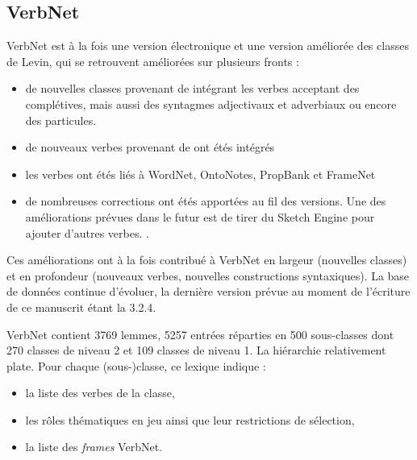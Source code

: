 \subsection{VerbNet}
\label{subsec:presentation_verbnet}

VerbNet \citep{kipperschuler2005verbnet} est à la fois une version électronique
et une version améliorée des classes de Levin, qui se retrouvent améliorées sur
plusieurs fronts :

\begin{itemize}

    \item de nouvelles classes provenant de \cite{korhonen2004extended}
        intégrant les verbes acceptant des complétives, mais aussi des
        syntagmes adjectivaux et adverbiaux ou encore des particules.

    \item de nouveaux verbes provenant de \cite{dorr2001lcs} ont étés intégrés

    \item les verbes ont étés liés à WordNet, OntoNotes, PropBank et FrameNet
        \citep{palmer2009semlink}

    \item de nombreuses corrections ont étés apportées au fil des versions. Une
        des améliorations prévues dans le futur est de tirer du Sketch Engine
        pour ajouter d'autres verbes. \citep{bonial2013expanding}.

\end{itemize}

Ces améliorations ont à la fois contribué à VerbNet en largeur (nouvelles
classes) et en profondeur (nouveaux verbes, nouvelles constructions
syntaxiques). La base de données continue d'évoluer, la dernière version prévue
au moment de l'écriture de ce manuscrit étant la 3.2.4.

VerbNet contient 3769 lemmes, 5257 entrées réparties en 500 sous-classes dont
270 classes de niveau 2 et 109 classes de niveau 1. La hiérarchie relativement
plate. Pour chaque (sous-)classe, ce lexique indique :

\begin{itemize}
        \item la liste des verbes de la classe,
        \item les rôles thématiques en jeu ainsi que leur restrictions de sélection,
        \item la liste des \emph{frames} VerbNet.
\end{itemize}


